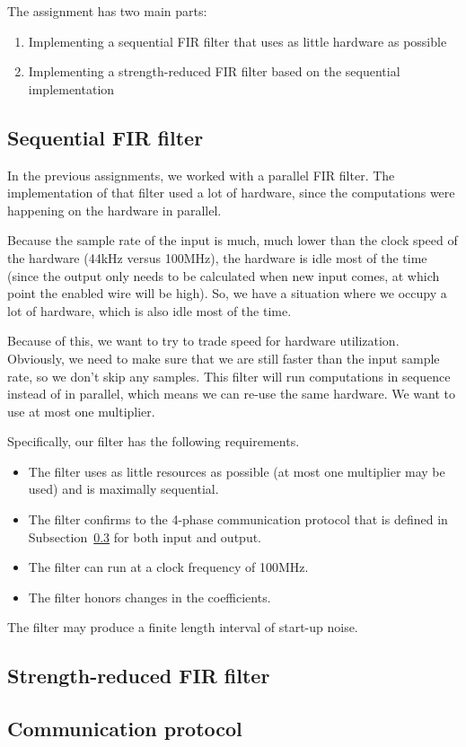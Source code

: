 
The assignment has two main parts:
\begin{enumerate}
	\item Implementing a sequential FIR filter that uses as little hardware as possible
	\item Implementing a strength-reduced FIR filter based on the sequential implementation
\end{enumerate}

\subsection{Sequential FIR filter}
In the previous assignments, we worked with a parallel FIR filter.
The implementation of that filter used a lot of hardware, since the computations were happening on the hardware in parallel.

Because the sample rate of the input is much, much lower than the clock speed of the hardware (44kHz versus 100MHz), the hardware is idle most of the time (since the output only needs to be calculated when new input comes, at which point the enabled wire will be high).
So, we have a situation where we occupy a lot of hardware, which is also idle most of the time.

Because of this, we want to try to trade speed for hardware utilization.
Obviously, we need to make sure that we are still faster than the input sample rate, so we don't skip any samples.
This filter will run computations in sequence instead of in parallel, which means we can re-use the same hardware.
We want to use at most one multiplier.

Specifically, our filter has the following requirements.

\begin{itemize}
	\item The filter uses as little resources as possible (at most one multiplier may be used) and is maximally sequential.
	\item The filter confirms to the 4-phase communication protocol that is defined in Subsection~\ref{sec:analysis:communication} for both input and output.
	\item The filter can run at a clock frequency of 100MHz.
	\item The filter honors changes in the coefficients.
\end{itemize}

The filter may produce a finite length interval of start-up noise.

\subsection{Strength-reduced FIR filter}

\subsection{Communication protocol}
\label{sec:analysis:communication}
